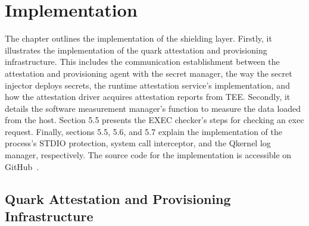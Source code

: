 \chapter{Implementation}
\label{sec:implementation}



The chapter outlines the implementation of the shielding layer. Firstly, it illustrates the implementation of the quark attestation and provisioning infrastructure. This includes the communication establishment between the attestation and provisioning agent with the secret manager, the way the secret 
injector deploys secrets, the runtime attestation service's implementation, and how the attestation driver acquires attestation reports from TEE. Secondly, it details the software measurement manager's function to measure the data loaded from the host. Section 5.5 presents the EXEC checker's steps for 
checking an exec request. Finally, sections 5.5, 5.6, and 5.7 explain the implementation of the process's STDIO protection, system call interceptor, and the Qkernel log manager, respectively. The source code for the implementation is accessible on GitHub~\cite*{theis_source_code}.

\section{Quark Attestation and Provisioning Infrastructure}

